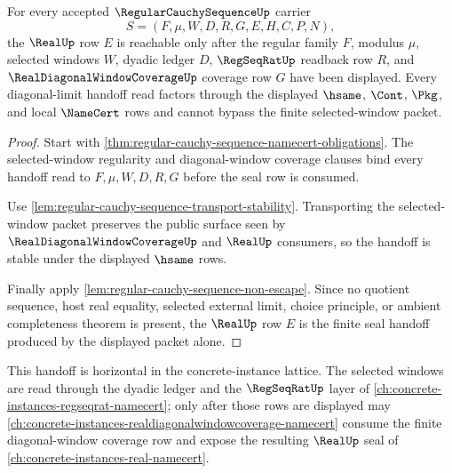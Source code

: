 \begin{theorem}
\label{thm:regular-cauchy-sequence-realseal-handoff}
For every accepted $\RegularCauchySequenceUp$ carrier
$$
S=(F,\mu,W,D,R,G,E,H,C,P,N),
$$
the $\RealUp$ row $E$ is reachable only after the regular family $F$, modulus $\mu$, selected windows $W$, dyadic ledger $D$, $\RegSeqRatUp$ readback row $R$, and $\RealDiagonalWindowCoverageUp$ coverage row $G$ have been displayed. Every diagonal-limit handoff read factors through the displayed $\hsame$, $\Cont$, $\Pkg$, and local $\NameCert$ rows and cannot bypass the finite selected-window packet.
\end{theorem}
\begin{proof}
Start with \autoref{thm:regular-cauchy-sequence-namecert-obligations}. The selected-window regularity and diagonal-window coverage clauses bind every handoff read to $F,\mu,W,D,R,G$ before the seal row is consumed.

Use \autoref{lem:regular-cauchy-sequence-transport-stability}. Transporting the selected-window packet preserves the public surface seen by $\RealDiagonalWindowCoverageUp$ and $\RealUp$ consumers, so the handoff is stable under the displayed $\hsame$ rows.

Finally apply \autoref{lem:regular-cauchy-sequence-non-escape}. Since no quotient sequence, host real equality, selected external limit, choice principle, or ambient completeness theorem is present, the $\RealUp$ row $E$ is the finite seal handoff produced by the displayed packet alone.
\end{proof}

This handoff is horizontal in the concrete-instance lattice. The selected windows are read through the dyadic ledger and the $\RegSeqRatUp$ layer of \autoref{ch:concrete-instances-regseqrat-namecert}; only after those rows are displayed may \autoref{ch:concrete-instances-realdiagonalwindowcoverage-namecert} consume the finite diagonal-window coverage row and expose the resulting $\RealUp$ seal of \autoref{ch:concrete-instances-real-namecert}.

